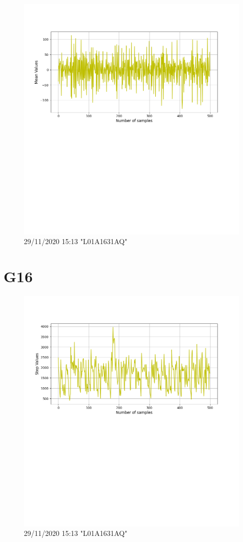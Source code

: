\documentclass[hidelinks, 12pt, a4paper]{article}
\begin{document}
\begin{figure}[h!]
\centering
	\includegraphics[height=.38\textheight, width=\textwidth]{assets/session2/g15.png}
    \caption{29/11/2020 15:13 "L01A1631AQ"}
\end{figure}

\section{G16}

\begin{figure}[h!]
\centering
	\includegraphics[height=.38\textheight, width=\textwidth]{assets/session2/g16.png}
    \caption{29/11/2020 15:13 "L01A1631AQ"}
\end{figure}
\end{document}
